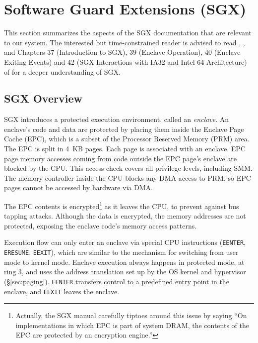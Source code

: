\section{Software Guard Extensions (SGX)}
\label{sec:sgx}

This section summarizes the aspects of the SGX documentation that are relevant
to our system. The interested but time-constrained reader is advised to read
\cite{mckeen2013sgx}, \cite{anati2013sgx}, and Chapters 37 (Introduction
to SGX), 39 (Enclave Operation), 40 (Enclave Exiting Events) and 42 (SGX
Interactions with IA32 and Intel 64 Architecture) of \cite{intel2015sdm}
for a deeper understanding of SGX.


\subsection{SGX Overview}
\label{sec:sgx_overview}

SGX introduces a protected execution environment, called an \textit{enclave}.
An enclave's code and data are protected by placing them inside the Enclave
Page Cache (EPC), which is a subset of the Processor Reserved Memory (PRM)
area. The EPC is split in 4~KB pages. Each page is associated with an enclave.
EPC page memory accesses coming from code outside the EPC page's enclave are
blocked by the CPU. This access check covers all privilege levels, including
SMM. The memory controller inside the CPU blocks any DMA access to PRM, so EPC
pages cannot be accessed by hardware via DMA.

The EPC contents is encrypted\footnote{Actually, the SGX manual carefully
tiptoes around this issue by saying ``On implementations in which EPC is part
of system DRAM, the contents of the EPC are protected by an encryption
engine.''} as it leaves the CPU, to prevent against bus tapping attacks.
Although the data is encrypted, the memory addresses are not protected,
exposing the enclave code's memory access patterns.

Execution flow can only enter an enclave via special CPU instructions
(\texttt{EENTER}, \texttt{ERESUME}, \texttt{EEXIT}), which are similar to the
mechanism for switching from user mode to kernel mode. Enclave execution always
happens in protected mode, at ring 3, and uses the address translation set up
by the OS kernel and hypervisor (\S \ref{sec:paging}). \texttt{EENTER}
transfers control to a predefined entry point in the enclave, and
\texttt{EEXIT} leaves the enclave.


